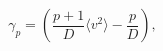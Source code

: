 \begin{equation}
\gamma_p 
   = \left( \frac{p+1}{D}\langle v^2 \rangle
           -\frac{p}{D}
     \right),
\end{equation}

